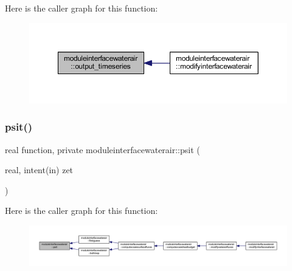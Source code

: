 Here is the caller graph for this function\+:\nopagebreak
\begin{figure}[H]
\begin{center}
\leavevmode
\includegraphics[width=350pt]{namespacemoduleinterfacewaterair_a739b5f50c0652ff91c9f777fbf68729f_icgraph}
\end{center}
\end{figure}
\mbox{\label{namespacemoduleinterfacewaterair_a65968d6dee9f2e512ec37dd5d4fe8fe1}} 
\subsubsection{\texorpdfstring{psit()}{psit()}}
{\footnotesize\ttfamily real function, private moduleinterfacewaterair\+::psit (\begin{DoxyParamCaption}\item[{real, intent(in)}]{zet }\end{DoxyParamCaption})\hspace{0.3cm}{\ttfamily [private]}}

Here is the caller graph for this function\+:\nopagebreak
\begin{figure}[H]
\begin{center}
\leavevmode
\includegraphics[width=350pt]{namespacemoduleinterfacewaterair_a65968d6dee9f2e512ec37dd5d4fe8fe1_icgraph}
\end{center}
\end{figure}
\mbox{\label{namespacemoduleinterfacewaterair_af976a3b281048d4f32222b16621b556a}} 

